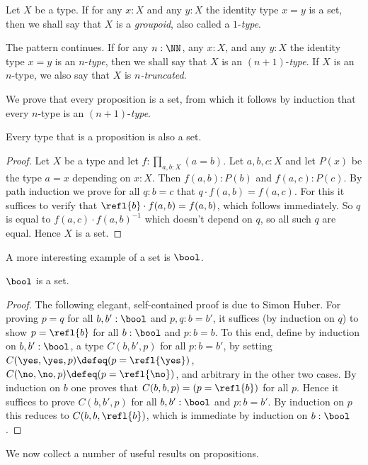 Let $X$ be a type.
If for any $x:X$ and any $y:X$ the identity type $x=y$ is a set,
then we shall say that $X$ is a \emph{groupoid},
also called a $1$-\emph{type}.

The pattern continues.  If for any $n:\NN$, any $x:X$, and any $y:X$
the identity type $x=y$ is an $n$-\emph{type},
then we shall say that $X$ is an $(n+1)$-\emph{type}.
If $X$ is an $n$-type, we also say that $X$ is \emph{$n$-truncated}.

We prove that every proposition is a set, from which it follows
by induction that every $n$-type is an $(n+1)$-\emph{type}.

\begin{lemma}\label{lem:prop-is-set}
Every type that is a proposition is also a set.
\end{lemma}
\begin{proof}
Let $X$ be a type and let $f: \prod_{a,b:X} (a=b)$. Let $a,b,c : X$ and
let $P(x)$ be the type $a=x$ depending on $x:X$. Then
$f(a,b):P(b)$ and $f(a,c):P(c)$. By path induction we prove for
all $q:b=c$ that $q\cdot f(a,b) = f(a,c)$. For this it suffices to
verify that $\refl{b} \cdot f(a,b) = f(a,b)$, which follows immediately.
So $q$ is equal to $f(a,c)\cdot f(a,b)^{-1}$ which doesn't
depend on $q$, so all such $q$ are equal. Hence $X$ is a set.
\end{proof}

A more interesting example of a set is $\bool$.

\begin{lemma}\label{lem:isset-bool}
$\bool$ is a set.
\end{lemma}
\begin{proof}
The following elegant, self-contained proof is due to Simon Huber.
For proving $p=q$ for all $b,b':\bool$ and $p,q: b=b'$,
it suffices (by induction on $q$) to show
$p=\refl{b}$ for all $b:\bool$ and $p: b=b$.
To this end, define by induction on $b,b':\bool$,
a type $C(b,b',p)$ for all $p: b=b'$, by setting
$C(\yes,\yes,p)\defeq (p=\refl{\yes})$,
$C(\no,\no,p)\defeq (p=\refl{\no})$,
and arbitrary in the other two cases.
By induction on $b$ one proves that $C(b,b,p)=(p=\refl{b})$ for all $p$.
Hence it suffices to prove $C(b,b',p)$ for all $b,b':\bool$
and $p: b=b'$. By induction on $p$ this reduces to
$C(b,b,\refl{b})$, which is immediate by induction on $b:\bool$.
\end{proof}

We now collect a number of useful results on propositions.

